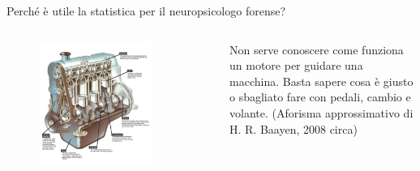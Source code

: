 \documentclass[
  ignorenonframetext,
]{beamer}
\begin{document}
\begin{frame}{Perché è utile la statistica per il neuropsicologo
forense?}
\label{perchuxe9-uxe8-utile-la-statistica-per-il-neuropsicologo-forense}
\begin{columns}

\begin{figure}
\includegraphics[width=0.8\textwidth]{Figures/Motore.png}
\end{figure}
\tiny{Non serve conoscere come funziona un motore per guidare una macchina. Basta sapere cosa è giusto o sbagliato fare con pedali, cambio e volante. (Aforisma approssimativo di H. R. Baayen, 2008 circa)}

\pause
{}


\end{columns}
\end{frame}
\end{document}
